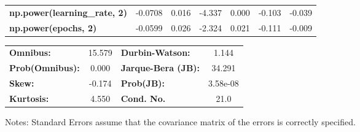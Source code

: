 \begin{center}
\begin{tabular}{lcccccc}
\textbf{np.power(learning\_rate, 2)} &      -0.0708  &        0.016     &    -4.337  &         0.000        &       -0.103    &       -0.039     \\
\textbf{np.power(epochs, 2)}         &      -0.0599  &        0.026     &    -2.324  &         0.021        &       -0.111    &       -0.009     \\
\bottomrule
\end{tabular}
\begin{tabular}{lclc}
\textbf{Omnibus:}       & 15.579 & \textbf{  Durbin-Watson:     } &    1.144  \\
\textbf{Prob(Omnibus):} &  0.000 & \textbf{  Jarque-Bera (JB):  } &   34.291  \\
\textbf{Skew:}          & -0.174 & \textbf{  Prob(JB):          } & 3.58e-08  \\
\textbf{Kurtosis:}      &  4.550 & \textbf{  Cond. No.          } &     21.0  \\
\bottomrule
\end{tabular}
\end{center}

Notes: \newline
 [1] Standard Errors assume that the covariance matrix of the errors is correctly specified.